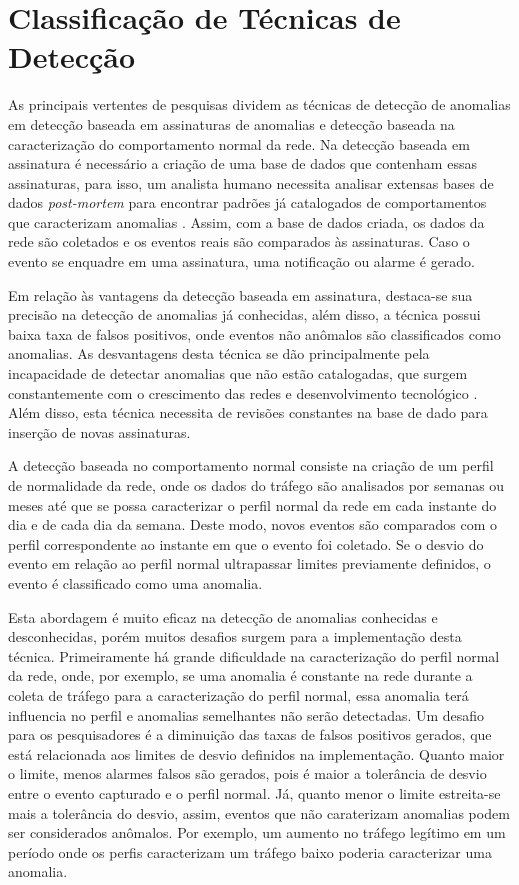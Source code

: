   \section{Classificação de Técnicas de Detecção}

\indent As principais vertentes de pesquisas dividem as técnicas de detecção de anomalias em detecção baseada em assinaturas de anomalias e detecção baseada na caracterização do comportamento normal da rede. Na detecção baseada em assinatura é necessário a criação de uma base de dados que contenham essas assinaturas, para isso, um analista humano necessita analisar extensas bases de dados \textit{post-mortem} para encontrar padrões já catalogados de comportamentos que caracterizam anomalias \cite{Silva2007}. Assim, com a base de dados criada, os dados da rede são coletados e os eventos reais são comparados às assinaturas. Caso o evento se enquadre em uma assinatura, uma notificação ou alarme é gerado.

\indent Em relação às vantagens da detecção baseada em assinatura, destaca-se sua precisão na detecção de anomalias já conhecidas, além disso, a técnica possui baixa taxa de falsos positivos, onde eventos não anômalos são classificados como anomalias. As desvantagens desta técnica se dão principalmente pela incapacidade de detectar anomalias que não estão catalogadas, que surgem constantemente com o crescimento das redes e desenvolvimento tecnológico \cite{Zarpelao2010}. Além disso, esta técnica necessita de revisões constantes na base de dado para inserção de novas assinaturas.

\indent A detecção baseada no comportamento normal consiste na criação de um perfil de normalidade da rede, onde os dados do tráfego são analisados por semanas ou meses até que se possa caracterizar o perfil normal da rede em cada instante do dia e de cada dia da semana. Deste modo, novos eventos são comparados com o perfil correspondente ao instante em que o evento foi coletado. Se o desvio do evento em relação ao perfil normal ultrapassar limites previamente definidos, o evento é classificado como uma anomalia.

\indent Esta abordagem é muito eficaz na detecção de anomalias conhecidas e desconhecidas, porém muitos desafios surgem para a implementação desta técnica. Primeiramente há grande dificuldade na caracterização do perfil normal da rede, onde, por exemplo, se uma anomalia é constante na rede durante a coleta de tráfego para a caracterização do perfil normal, essa anomalia terá influencia no perfil e anomalias semelhantes não serão detectadas. Um desafio para os pesquisadores é a diminuição das taxas de falsos positivos gerados, que está relacionada aos limites de desvio definidos na implementação. Quanto maior o limite, menos alarmes falsos são gerados, pois é maior a tolerância de desvio entre o evento capturado e o perfil normal. Já, quanto menor o limite estreita-se mais a tolerância do desvio, assim, eventos que não caraterizam anomalias podem ser considerados anômalos. Por exemplo, um aumento no tráfego legítimo em um período onde os perfis caracterizam um tráfego baixo poderia caracterizar uma anomalia.

